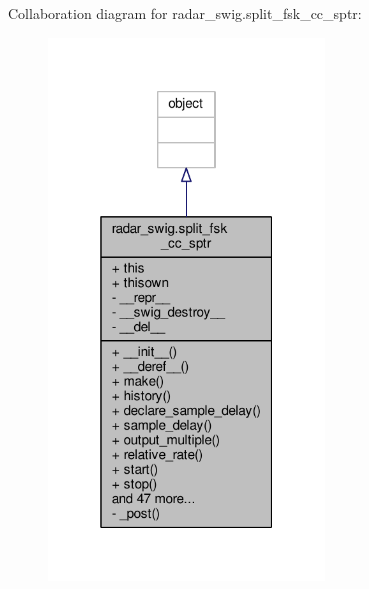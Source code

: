 Collaboration diagram for radar\+\_\+swig.\+split\+\_\+fsk\+\_\+cc\+\_\+sptr\+:
\nopagebreak
\begin{figure}[H]
\begin{center}
\leavevmode
\includegraphics[width=208pt]{d8/ddd/classradar__swig_1_1split__fsk__cc__sptr__coll__graph}
\end{center}
\end{figure}
